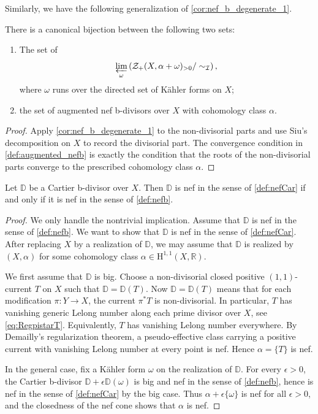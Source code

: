Similarly, we have the following generalization of \cref{cor:nef_b_degenerate_1}.
\begin{corollary}\label{cor:nef_b_degenerate_2}
    There is a canonical bijection between the following two sets:
    \begin{enumerate}
        \item\label{itm:cor:nef_b_degenerate_2:1} The set of
        \[
            \varprojlim_{\omega} \left( \mathcal{Z}_+(X,\alpha+\omega)_{>0}/\sim_{\mathcal{I}} \right),
        \]
        where $\omega$ runs over the directed set of Kähler forms on $X$;
    \item\label{itm:cor:nef_b_degenerate_2:2} the set of augmented nef b-divisors over $X$ with cohomology class $\alpha$.
    \end{enumerate}
\end{corollary}
\begin{proof}
Apply \cref{cor:nef_b_degenerate_1} to the non-divisorial parts and use Siu's decomposition on $X$ to record the divisorial part. The convergence condition in \cref{def:augmented_nefb} is exactly the condition that the roots of the non-divisorial parts converge to the prescribed cohomology class $\alpha$.
\end{proof}

\begin{corollary}\label{cor:nefbCequiv}
    Let $\mathbb{D}$ be a Cartier b-divisor over $X$. Then $\mathbb{D}$ is nef in the sense of \cref{def:nefCar} if and only if it is nef in the sense of \cref{def:nefb}.
\end{corollary}

\begin{proof}
    We only handle the nontrivial implication. Assume that $\mathbb{D}$ is nef in the sense of \cref{def:nefb}. We want to show that $\mathbb{D}$ is nef in the sense of \cref{def:nefCar}. After replacing $X$ by a realization of $\mathbb{D}$, we may assume that $\mathbb{D}$ is realized by $(X,\alpha)$ for some cohomology class $\alpha\in \mathrm{H}^{1,1}(X,\mathbb{R})$.

    We first assume that $\mathbb{D}$ is big. Choose a non-divisorial closed positive $(1,1)$-current $T$ on $X$ such that $\mathbb{D}=\mathbb{D}(T)$. Now $\mathbb{D}=\mathbb{D}(T)$ means that for each modification $\pi\colon Y\rightarrow X$, the current $\pi^*T$ is non-divisorial. In particular, $T$ has vanishing generic Lelong number along each prime divisor over $X$, see \eqref{eq:RegpistarT}. Equivalently, $T$ has vanishing Lelong number everywhere. By Demailly's regularization theorem, a pseudo-effective class carrying a positive current with vanishing Lelong number at every point is nef. Hence $\alpha=\{T\}$ is nef.

    In the general case, fix a Kähler form $\omega$ on the realization of $\mathbb{D}$. For every $\epsilon>0$, the Cartier b-divisor $\mathbb{D}+\epsilon\mathbb{D}(\omega)$ is big and nef in the sense of \cref{def:nefb}, hence is nef in the sense of \cref{def:nefCar} by the big case. Thus $\alpha+\epsilon\{\omega\}$ is nef for all $\epsilon>0$, and the closedness of the nef cone shows that $\alpha$ is nef.
\end{proof}

